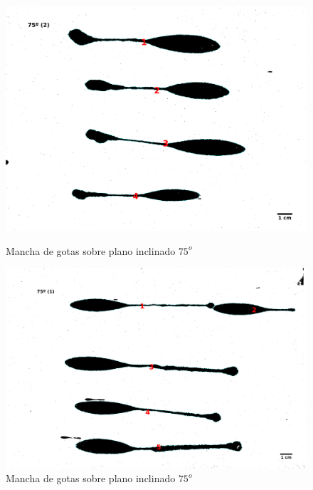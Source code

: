 \begin{figure}[H] \begin{minipage}{.5\textwidth} \centering
\includegraphics[width=1.0\linewidth]{src/75_deg-1.png} \caption{Mancha de
gotas sobre plano inclinado $75^o$} \label{fig:75deg-1} \end{minipage}%
\begin{minipage}{.5\textwidth} \centering
\includegraphics[width=1.0\linewidth]{src/75_2_deg-1.png} \caption{Mancha de
gotas sobre plano inclinado $75^o$} \label{fig:75deg-2} \end{minipage}

\end{figure}


